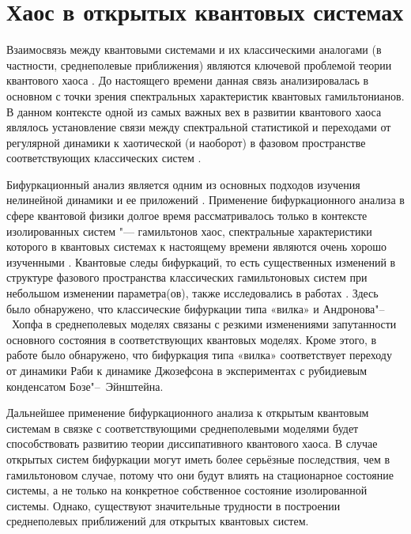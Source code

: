 \chapter{Хаос в открытых квантовых системах}\label{ch:ch3}

Взаимосвязь между квантовыми системами и их классическими аналогами (в частности, среднеполевые приближения) являются ключевой проблемой теории квантового хаоса \cite{Stockmann2006}. 
До настоящего времени данная связь анализировалась в основном с точки зрения спектральных характеристик квантовых гамильтонианов. 
В данном контексте одной из самых важных вех в развитии квантового хаоса являлось установление связи между спектральной статистикой и переходами от регулярной динамики к хаотической (и наоборот) в фазовом пространстве соответствующих классических систем \cite{Stockmann2006}.

Бифуркационный анализ \cite{Poincare1885} является одним из основных подходов изучения нелинейной динамики и ее приложений \cite{Kuznetsov2004}.
Применение бифуркационного анализа в сфере квантовой физики долгое время рассматривалось только в контексте изолированных систем  "---  гамильтонов хаос, спектральные характеристики которого в квантовых системах к настоящему времени являются очень хорошо изученными \cite{Casati1979, Gutzwiller1990}.
Квантовые следы бифуркаций, то есть существенных изменений в структуре фазового пространства классических гамильтоновых систем при небольшом изменении параметра(ов), также исследовались в работах \cite{Hines2005, Santos2006, Nemes2006}. Здесь было обнаружено, что классические бифуркации типа «вилка» и Андронова"--~Хопфа \cite{Wiggins2013} в среднеполевых моделях связаны с резкими изменениями запутанности основного состояния в соответствующих квантовых моделях.
Кроме этого, в работе \cite{Zibold2010} было обнаружено, что бифуркация типа «вилка» соответствует переходу от динамики Раби к динамике Джозефсона в экспериментах с рубидиевым конденсатом Бозе"--~Эйнштейна.

Дальнейшее применение бифуркационного анализа к открытым квантовым системам в связке с соответствующими среднеполевыми моделями будет способствовать развитию теории диссипативного квантового хаоса. 
В случае открытых систем бифуркации могут иметь более серьёзные последствия, чем в гамильтоновом случае, потому что они будут влиять на стационарное состояние системы, а не только на конкретное собственное состояние изолированной системы.
Однако, существуют значительные трудности в построении среднеполевых приближений для открытых квантовых систем.

